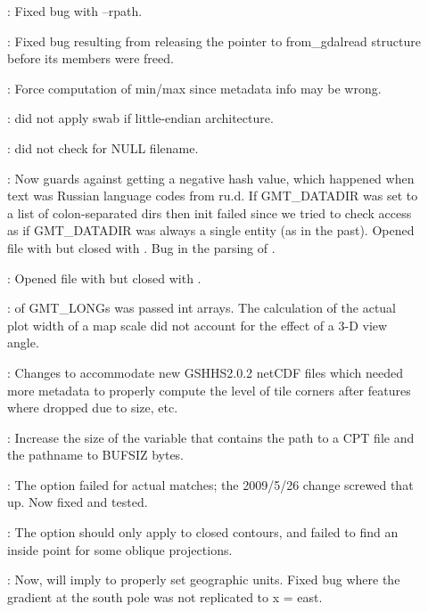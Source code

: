 \begin{description}
	\item []:	Fixed bug with --rpath.
	\item []:	Fixed bug resulting from releasing the pointer to from\_gdalread
		structure before its members were freed.
	\item []:	Force computation of min/max since metadata info may be wrong.
	\item []:	 did not apply swab if little-endian architecture.
	\item []:	 did not check for NULL filename.
	\item []:	Now guards against getting a negative hash value, which happened
		when text was Russian language codes from ru.d.  If GMT\_DATADIR was set to a list of colon-separated dirs
		then init failed since we tried to check access as
		if GMT\_DATADIR was always a single entity (as in the past). Opened file with  but closed with .
		Bug in the parsing of .
	\item []:	Opened file with  but closed with .
	\item []:	 of GMT\_LONGs was passed int arrays.  The calculation
		of the actual plot width of a map scale did not account for the effect of a 3-D view angle.
	\item []:		Changes to accommodate new GSHHS2.0.2 netCDF files
		which needed more metadata to properly compute the level of tile corners after features where dropped
		due to size, etc.
	\item []:	Increase the size of the variable that contains the path to
		a CPT file and the pathname to BUFSIZ bytes.
	\item []:	The  option failed for actual matches; the 2009/5/26
		change screwed that up.  Now fixed and tested.
	\item []:	The  option should only apply to closed contours, and
		 failed to find an inside point for some oblique projections.
	\item []:	Now,  will imply  to properly set geographic units.
		Fixed bug where the gradient at the south pole was not replicated to x = east.

\end{description}
